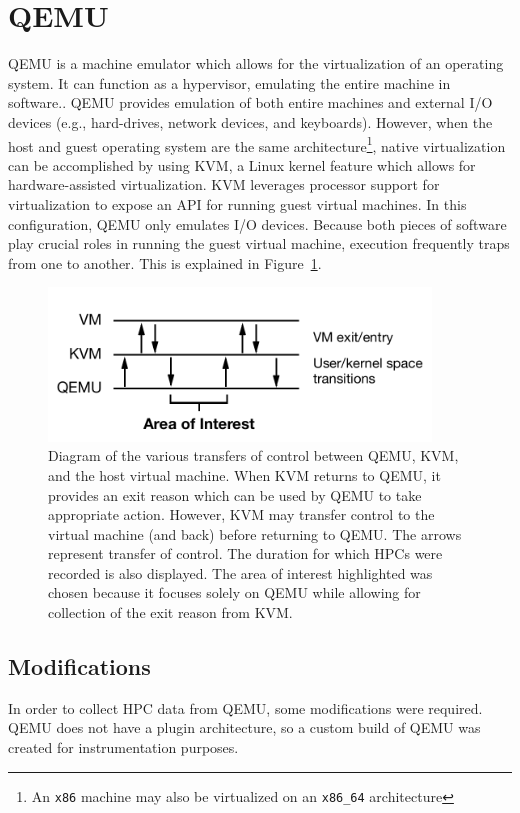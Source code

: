 \documentclass[notitlepage]{article}
\begin{document}
\section{QEMU}
\label{sec:qemu}
QEMU is a machine emulator which allows for the virtualization of an operating
system. It can function as a hypervisor, emulating the entire machine in
software.. QEMU provides emulation of both entire machines and external I/O
devices (e.g., hard-drives, network devices, and keyboards). However, when the
host and guest operating system are the same architecture\footnote{An
\texttt{x86} machine may also be virtualized on an \texttt{x86\_64}
architecture}, native virtualization can be accomplished by using KVM, a Linux
kernel feature which allows for hardware-assisted virtualization. KVM leverages
processor support for virtualization to expose an API for running guest virtual
machines. In this configuration, QEMU only emulates I/O devices.  Because both
pieces of software play crucial roles in running the guest virtual machine,
execution frequently traps from one to another. This is explained in
Figure~\ref{fig:qemutrap}.

\begin{figure}
    \centering    
    \includegraphics[width=4in]{qemu_trap.pdf}
    \caption{Diagram of the various transfers of control between QEMU, KVM, and
        the host virtual machine. When KVM returns to QEMU, it provides an exit
        reason which can be used by QEMU to take appropriate action. However,
        KVM may transfer control to the virtual machine (and back) before
        returning to QEMU. The arrows represent transfer of control. The
        duration for which HPCs were recorded is also displayed. The area of
        interest highlighted was chosen because it focuses solely on QEMU while
        allowing for collection of the exit reason from KVM.}
\label{fig:qemutrap}
\end{figure}

\subsection{Modifications}
In order to collect HPC data from QEMU, some modifications were required. QEMU
does not have a plugin architecture, so a custom build of QEMU was created for
instrumentation purposes.
\end{document}
